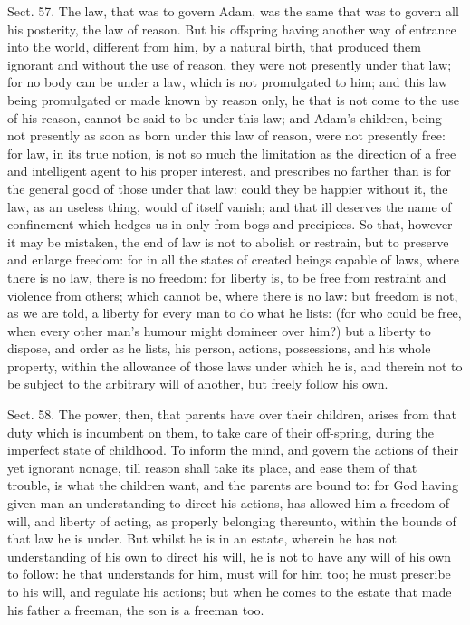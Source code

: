 \documentclass[11pt,openany]{book}
\begin{document}
Sect. 57. The law, that was to govern Adam, was the same that was to govern all his posterity, the law of reason. But his offspring having another way of entrance into the world, different from him, by a natural birth, that produced them ignorant and without the use of reason, they were not presently under that law; for no body can be under a law, which is not promulgated to him; and this law being promulgated or made known by reason only, he that is not come to the use of his reason, cannot be said to be under this law; and Adam's children, being not presently as soon as born under this law of reason, were not presently free: for law, in its true notion, is not so much the limitation as the direction of a free and intelligent agent to his proper interest, and prescribes no farther than is for the general good of those under that law: could they be happier without it, the law, as an useless thing, would of itself vanish; and that ill deserves the name of confinement which hedges us in only from bogs and precipices. So that, however it may be mistaken, the end of law is not to abolish or restrain, but to preserve and enlarge freedom: for in all the states of created beings capable of laws, where there is no law, there is no freedom: for liberty is, to be free from restraint and violence from others; which cannot be, where there is no law: but freedom is not, as we are told, a liberty for every man to do what he lists: (for who could be free, when every other man's humour might domineer over him?) but a liberty to dispose, and order as he lists, his person, actions, possessions, and his whole property, within the allowance of those laws under which he is, and therein not to be subject to the arbitrary will of another, but freely follow his own.

Sect. 58. The power, then, that parents have over their children, arises from that duty which is incumbent on them, to take care of their off-spring, during the imperfect state of childhood. To inform the mind, and govern the actions of their yet ignorant nonage, till reason shall take its place, and ease them of that trouble, is what the children want, and the parents are bound to: for God having given man an understanding to direct his actions, has allowed him a freedom of will, and liberty of acting, as properly belonging thereunto, within the bounds of that law he is under. But whilst he is in an estate, wherein he has not understanding of his own to direct his will, he is not to have any will of his own to follow: he that understands for him, must will for him too; he must prescribe to his will, and regulate his actions; but when he comes to the estate that made his father a freeman, the son is a freeman too.
\end{document}
